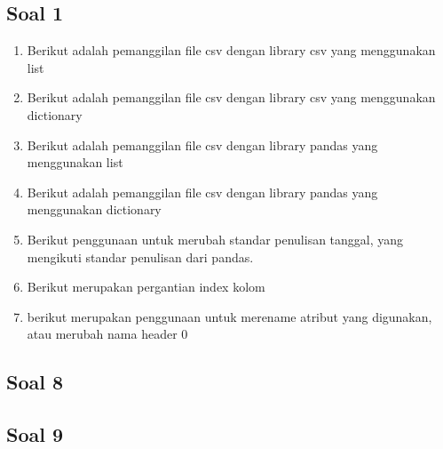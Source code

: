 \subsection{Soal 1}
\begin{enumerate}

\item Berikut adalah pemanggilan file csv dengan library csv yang menggunakan list


\item Berikut adalah pemanggilan file csv dengan library csv yang menggunakan dictionary


\item Berikut adalah pemanggilan file csv dengan library pandas yang menggunakan list


\item Berikut adalah pemanggilan file csv dengan library pandas yang menggunakan dictionary


\item Berikut penggunaan untuk merubah standar penulisan tanggal, yang mengikuti standar penulisan dari pandas.


\item Berikut merupakan pergantian index kolom


\item berikut merupakan penggunaan untuk merename atribut yang digunakan, atau merubah nama header 0

\end{enumerate}

\subsection{Soal 8}


\subsection{Soal 9}



